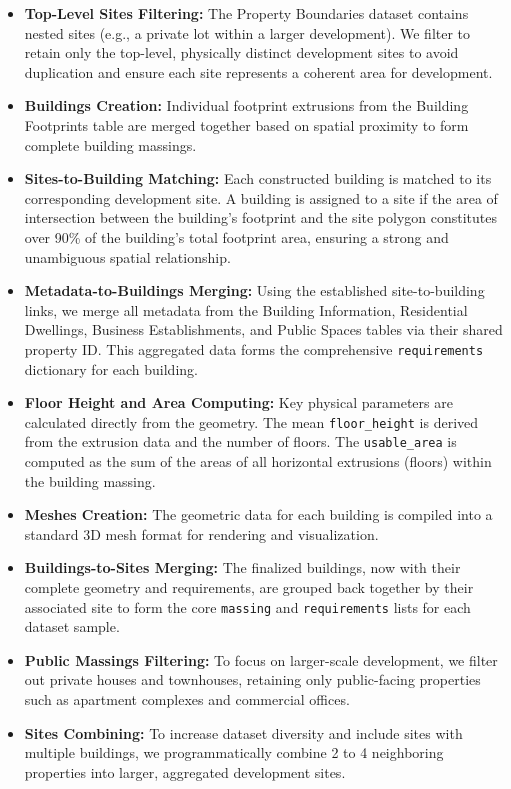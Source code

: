 \begin{itemize}
    \item \textbf{Top-Level Sites Filtering:} The Property Boundaries dataset contains nested sites (e.g., a private lot within a larger development). We filter to retain only the top-level, physically distinct development sites to avoid duplication and ensure each site represents a coherent area for development.
    \item \textbf{Buildings Creation:} Individual footprint extrusions from the Building Footprints table are merged together based on spatial proximity to form complete building massings.
    \item \textbf{Sites-to-Building Matching:} Each constructed building is matched to its corresponding development site. A building is assigned to a site if the area of intersection between the building's footprint and the site polygon constitutes over 90\% of the building's total footprint area, ensuring a strong and unambiguous spatial relationship.
    \item \textbf{Metadata-to-Buildings Merging:} Using the established site-to-building links, we merge all metadata from the Building Information, Residential Dwellings, Business Establishments, and Public Spaces tables via their shared property ID. This aggregated data forms the comprehensive \texttt{requirements} dictionary for each building.
    \item \textbf{Floor Height and Area Computing:} Key physical parameters are calculated directly from the geometry. The mean \texttt{floor\_height} is derived from the extrusion data and the number of floors. The \texttt{usable\_area} is computed as the sum of the areas of all horizontal extrusions (floors) within the building massing.
    \item \textbf{Meshes Creation:} The geometric data for each building is compiled into a standard 3D mesh format for rendering and visualization.
    \item \textbf{Buildings-to-Sites Merging:} The finalized buildings, now with their complete geometry and requirements, are grouped back together by their associated site to form the core \texttt{massing} and \texttt{requirements} lists for each dataset sample.
    \item \textbf{Public Massings Filtering:} To focus on larger-scale development, we filter out private houses and townhouses, retaining only public-facing properties such as apartment complexes and commercial offices.
    \item \textbf{Sites Combining:} To increase dataset diversity and include sites with multiple buildings, we programmatically combine 2 to 4 neighboring properties into larger, aggregated development sites.
\end{itemize}

